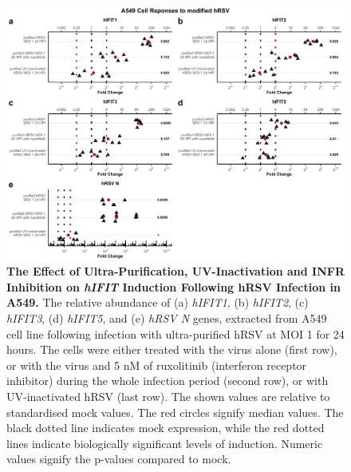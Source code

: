 \begin{figure}
    \centering
    \includegraphics[width=1\linewidth]{06. Chapter 1/Figs/01. Induction/06. a549_hrsv_uv_roxo.pdf}
    \caption[The Effect of Ultra-Purification, UV-Inactivation and INFR Inhibition on \textit{hIFIT} Induction Following hRSV Infection in A549.]{\textbf{The Effect of Ultra-Purification, UV-Inactivation and INFR Inhibition on \textit{hIFIT} Induction Following hRSV Infection in A549.} The relative abundance of (a) \textit{hIFIT1}, (b) \textit{hIFIT2}, (c) \textit{hIFIT3}, (d) \textit{hIFIT5}, and (e) \textit{hRSV N} genes, extracted from A549 cell line following infection with ultra-purified hRSV at MOI 1 for 24 hours. The cells were either treated with the virus alone (first row), or with the virus and 5 nM of ruxolitinib (interferon receptor inhibitor) during the whole infection period (second row), or with UV-inactivated hRSV (last row). The shown values are relative to standardised mock values. The red circles signify median values. The black dotted line indicates mock expression, while the red dotted lines indicate biologically significant levels of induction. Numeric values signify the p-values compared to mock.}
    \label{The effect of ultra-purification, UV-inactivation and INFR inhibition on hIFIT induction following hRSV infection in A549}
\end{figure}
